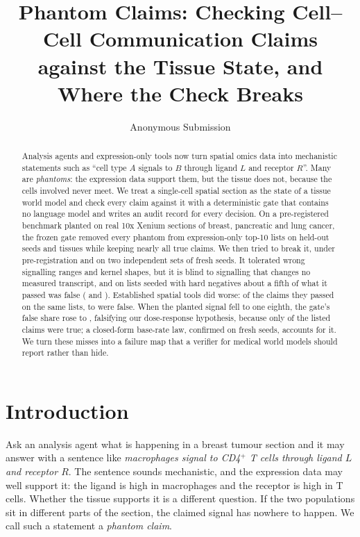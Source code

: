 \documentclass[letterpaper]{article} %
\title{Phantom Claims: Checking Cell--Cell Communication Claims against the Tissue State, and Where the Check Breaks}
\author{
    Anonymous Submission
}
\begin{document}
\maketitle

\begin{abstract}
Analysis agents and expression-only tools now turn spatial omics data into mechanistic statements such as ``cell type
$A$ signals to $B$ through ligand $L$ and receptor $R$''. Many are \emph{phantoms}: the expression data support them,
but the tissue does not, because the cells involved never meet. We treat a single-cell spatial section as the state of
a tissue world model and check every claim against it with a deterministic gate that contains no language model and
writes an audit record for every decision. On a pre-registered benchmark planted on real 10x Xenium sections of breast,
pancreatic and lung cancer, the frozen gate removed every phantom from expression-only top-10 lists on held-out seeds
and tissues while keeping nearly all true claims. We then tried to break it, under pre-registration and on two
independent sets of fresh seeds. It tolerated wrong signalling ranges and kernel shapes, but it is blind to signalling
that changes no measured transcript, and on lists seeded with hard negatives about a fifth of what it passed was false
(\hfourAfivePRafter{} and \hfourNthreeAfivePRafter{}). Established spatial tools did worse: of the claims they passed on
the same lists, \sbNhoodFPS{} to \sbSpatialdmFPS{} were false. When the planted signal fell to one eighth, the gate's
false share rose to \hfiveDefaultEighthPRafter{}, falsifying our dose-response hypothesis, because only
\baseEighthPrevalenceTrue{} of the listed claims were true; a closed-form base-rate law, confirmed on fresh seeds,
accounts for it. We turn these misses into a failure map that a verifier for medical world models should report rather
than hide.
\end{abstract}

\section{Introduction}
Ask an analysis agent what is happening in a breast tumour section and it may answer with a sentence like
\emph{macrophages signal to CD4$^+$ T cells through ligand $L$ and receptor $R$}. The sentence sounds mechanistic, and
the expression data may well support it: the ligand is high in macrophages and the receptor is high in T cells.
Whether the tissue supports it is a different question. If the two populations sit in different parts of the section,
the claimed signal has nowhere to happen. We call such a statement a \emph{phantom claim}.
\end{document}
